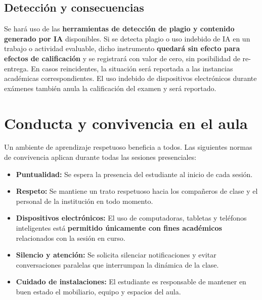 \documentclass[12pt]{article}
\begin{document}
	\subsection*{Detección y consecuencias}
	
	Se hará uso de las \textbf{herramientas de detección de plagio y contenido generado por IA} disponibles. Si se detecta plagio o uso indebido de IA en un trabajo o actividad evaluable, dicho instrumento \textbf{quedará sin efecto para efectos de calificación} y se registrará con valor de cero, sin posibilidad de re-entrega. En casos reincidentes, la situación será reportada a las instancias académicas correspondientes. El uso indebido de dispositivos electrónicos durante exámenes también anula la calificación del examen y será reportado.
	
	\section*{Conducta y convivencia en el aula}
	
	Un ambiente de aprendizaje respetuoso beneficia a todos. Las siguientes normas de convivencia aplican durante todas las sesiones presenciales:
	
	\begin{itemize}
		\item \textbf{Puntualidad:} Se espera la presencia del estudiante al inicio de cada sesión.
		\item \textbf{Respeto:} Se mantiene un trato respetuoso hacia los compañeros de clase y el personal de la institución en todo momento.
		\item \textbf{Dispositivos electrónicos:} El uso de computadoras, tabletas y teléfonos inteligentes está \textbf{permitido únicamente con fines académicos} relacionados con la sesión en curso.
		\item \textbf{Silencio y atención:} Se solicita silenciar notificaciones y evitar conversaciones paralelas que interrumpan la dinámica de la clase.
		\item \textbf{Cuidado de instalaciones:} El estudiante es responsable de mantener en buen estado el mobiliario, equipo y espacios del aula.
	\end{itemize}
	
	
	
\end{document}
